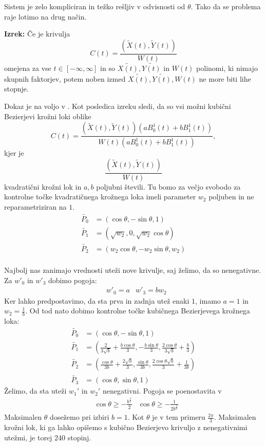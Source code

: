 \documentclass[a4paper,12pt]{article}
\begin{document}
Sistem je zelo kompliciran in težko rešljiv v odvisnosti od $\theta$. Tako da se problema raje lotimo na drug način. \\
\medskip

\noindent
\textbf{Izrek:} Če je krivulja
$$
C(t) = \frac{(\tilde{X}(t), \tilde{Y}(t))}{W(t)}
$$
omejena za vse $t \in [-\infty, \infty]$ in so $\tilde{X(t)}, \tilde{Y(t)}$ in $W(t)$ polinomi, ki nimajo skupnih faktorjev, potem noben izmed $\tilde{X(t)}, \tilde{Y(t)}, W(t)$ ne more biti lihe stopnje.

\medskip

\noindent

Dokaz je na voljo v \cite{article}. Kot posledica izreku sledi, da so vsi možni kubični Bezierjevi krožni loki oblike 
$$
C(t) = \frac{(\tilde{X}(t), \tilde{Y}(t))(a B_{0}^1(t) + b B_{1}^1(t))}{W(t)(a B_{0}^1(t) + b B_{1}^1(t))},
$$
kjer je 
$$
\frac{(\tilde{X}(t), \tilde{Y}(t))}{W(t)} 
$$
kvadratični krožni lok in $a,b$ poljubni števili. Tu bomo za večjo svobodo za kontrolne točke kvadratičnega krožnega loka imeli parameter $w_{2}$ poljuben in ne reparametriziran na $1$.
\begin{align*}
\tilde{P_{0}} &= (\cos \theta, - \sin \theta, 1) \\
\tilde{P_{1}} &= (\sqrt{w_{2}}, 0, \sqrt{w_{2}} \cos \theta) \\
\tilde{P_{2}} &= (w_{2}\cos \theta, - w_{2}\sin \theta, w_{2}) \\
\end{align*}

\noindent
Najbolj nas zanimajo vrednosti uteži nove krivulje, saj želimo, da so nenegativne. Za $w'_{0}$ in $w'_{3}$ dobimo pogoja:
\begin{align*}
& w'_{0} = a & w'_{3} = b w_{2}
\end{align*}
Ker lahko predpostavimo, da sta prva in zadnja utež enaki $1$, imamo $a=1$ in $w_{2} = \frac{1}{b}$. Od tod nato dobimo kontrolne točke kubičnega Bezierjevega krožnega loka:
\begin{align*}
\tilde{P_{0}} &= (\cos \theta, - \sin \theta, 1) \\
\tilde{P_{1}} &= (\frac{2}{3 \sqrt{b}} + \frac{b \cos \theta}{3}, - \frac{b \sin \theta}{3}, \frac{2 \cos \theta}{3 \sqrt{b}} + \frac{b}{3}) \\
\tilde{P_{2}} &= (\frac{\cos \theta}{3b} + \frac{2\sqrt{b}}{3}, \frac{\sin \theta}{3b}, \frac{2 \cos \theta \sqrt{b}}{3} + \frac{1}{3b}) \\
\tilde{P_{3}} &= (\cos \theta, \sin \theta, 1)
\end{align*}
Želimo, da sta uteži $w_{1}'$ in $w_{2}'$ nenegativni. Pogoja se poenostavita v
\begin{align*}
&\cos \theta \geq -\frac{b^{\frac{3}{2}}}{2}& \cos \theta \geq - \frac{1}{2 b^{\frac{3}{2}}}
\end{align*}
Maksimalen $\theta$ dosežemo pri izbiri $b=1$. Kot $\theta$ je v tem primeru $\frac{2\pi}{3}$. Maksimalen krožni lok, ki ga lahko opišemo s kubično Bezierjevo krivuljo z nenegativnimi utežmi, je torej 240 stopinj.
\end{document}
